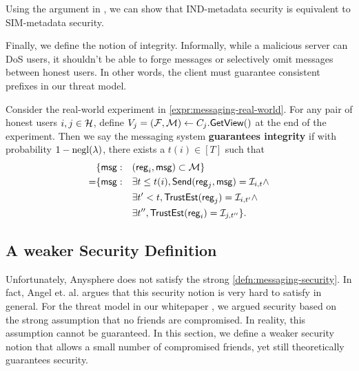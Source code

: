 Using the argument in \cite[Appendix A]{shi2021non}, we can show that IND-metadata security is equivalent to SIM-metadata security.

Finally, we define the notion of integrity. Informally, while a malicious server can DoS users, it shouldn't be able to forge messages  or selectively omit messages between honest users. In other words, the client must guarantee consistent prefixes in our threat model.
\begin{definition}
\label{defn:messaging-integrity}
Consider the real-world experiment in \cref{expr:messaging-real-world}. For any pair of honest users $i, j \in \mathcal{H}$, define $V_j = (\mathcal{F}, \mathcal{M}) \leftarrow C_j.\mathsf{GetView}()$ at the end of the experiment. Then we say the messaging system \textbf{guarantees integrity} if with probability $1 - \operatorname{negl}(\lambda)$, there exists a $t(i) \in [T]$ such that
\begin{align*}
     &\{\mathsf{msg}: &&(\mathsf{reg}_i, \mathsf{msg}) \subset \mathcal{M}\} \\
      =& \{\mathsf{msg}: &&\exists t \leq t(i), \mathsf{Send}(\mathsf{reg}_j, \mathsf{msg}) = \mathcal{I}_{i, t} \land \\
          &   &&\exists t' < t, \mathsf{TrustEst}(\mathsf{reg}_j) = \mathcal{I}_{i, t'} \land \\
          &   &&\exists t'', \mathsf{TrustEst}(\mathsf{reg}_i) = \mathcal{I}_{j, t''}\}.
\end{align*}
\end{definition}

\subsection{A weaker Security Definition}
\label{subsec:messaging-security-weaker}
Unfortunately, Anysphere does not satisfy the strong \cref{defn:messaging-security}. In fact, Angel et. al. \cite{angel2018cf} argues that this security notion is very hard to satisfy in general. For the threat model in our whitepaper \cite{whitepaper}, we argued security based on the strong assumption that no friends are compromised. In reality, this assumption cannot be guaranteed. In this section, we define a weaker security notion that allows a small number of compromised friends, yet still theoretically guarantees security.


